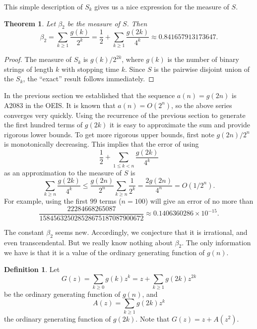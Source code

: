 \documentclass[12pt]{amsart}
\newtheorem{theorem}{Theorem}
\theoremstyle{definition}
\newtheorem{definition}{Definition}
\begin{document}
This simple description of $S_k$ gives us a nice expression for the measure of
$S$.

\begin{theorem}
    Let $\beta_2$ be the measure of $S$. Then
    \begin{equation*}
        \beta_2 = \sum_{k \geq 1} \frac{g(k)}{2^k} = \frac{1}{2} + \sum_{k \geq 1} \frac{g(2k)}{4^k}
        \approx 0.841657913173647.
    \end{equation*}
\end{theorem}

\begin{proof}
    The measure of $S_k$ is $g(k) / 2^{2k}$, where $g(k)$ is the number of
    binary strings of length $k$ with stopping time $k$. Since $S$ is the
    pairwise disjoint union of the $S_k$, the ``exact'' result follows
    immediately.
\end{proof}

In the previous section we established that the sequence $a(n) = g(2n)$ is
A2083 in the OEIS. It is known that $a(n) = O(2^n)$, so the above series
converges very quickly. Using the recurrence of the previous section to
generate the first hundred terms of $g(2k)$ it is easy to approximate the sum
and provide rigorous lower bounds. To get more rigorous upper bounds, first
note $g(2n) / 2^n$ is monotonically decreasing. This implies that the error of
using
\begin{equation*}
    \frac{1}{2} + \sum_{1 \leq k < n} \frac{g(2k)}{4^k}
\end{equation*}
as an approximation to the measure of $S$ is
\begin{equation*}
    \sum_{k \geq n} \frac{g(2k)}{4^k}
        \leq \frac{g(2n)}{2^n} \sum_{k \geq n} \frac{1}{2^k}
        = \frac{2g(2n)}{4^n}
        = O(1/2^n).
\end{equation*}
For example, using the first $99$ terms ($n = 100$) will give an error of no
more than
\begin{equation*}
    \frac{22284668265087}{158456325028528675187087900672}
    \approx 0.1406360286 \times 10^{-15}.
\end{equation*}

The constant $\beta_2$ seems new. Accordingly, we conjecture that it is
irrational, and even transcendental. But we really know nothing about
$\beta_2$. The only information we have is that it is a value of the ordinary
generating function of $g(n)$.

\begin{definition}
    Let
    \begin{equation*}
        G(z) = \sum_{k \geq 0} g(k) z^k = z + \sum_{k \geq 1} g(2k) z^{2k}
    \end{equation*}
    be the ordinary generating function of $g(n)$, and
    \begin{equation*}
        A(z) = \sum_{k \geq 1} g(2k) z^k
    \end{equation*}
    the ordinary generating function of $g(2k)$. Note that $G(z) = z + A(z^2)$.
\end{definition}
\end{document}
